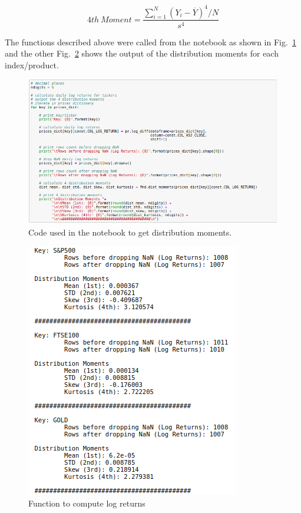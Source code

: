 \begin{equation} \label{eq:4mom}
    4th \ Moment = \frac{\sum_{i=1}^{N}(Y_i - \overline{Y})^4 / N}{s^4}
\end{equation}

\noindent
The functions described above were called from the notebook as shown in Fig.~\ref{fig:momcode} and the other Fig.~\ref{fig:momresults} shows the output of the distribution moments for each index/product. 

\begin{figure}[H]
\centering
  \includegraphics[scale = .60]{imgs/moments_code.png}
  \caption{Code used in the notebook to get distribution moments.}
  \label{fig:momcode}
\end{figure}

\begin{figure}[H]
\centering
  \includegraphics[scale = .60]{imgs/moments_results.png}
  \caption{Function to compute log returns }
  \label{fig:momresults}
\end{figure}

